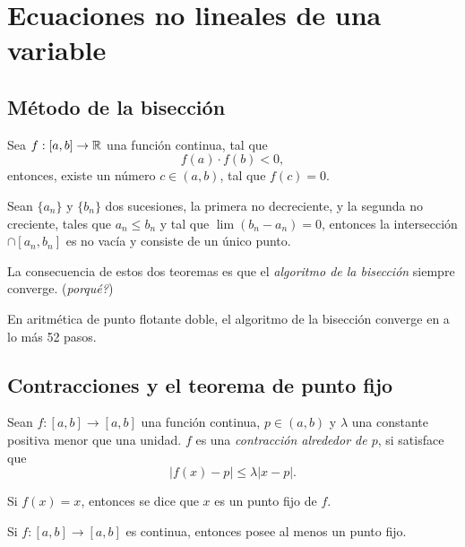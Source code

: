 \section{Ecuaciones no lineales de una variable}

\subsection{Método de la bisección}

\begin{theorem}
  Sea $f: [a, b] \to \mathbb{R}$ una función continua, tal que 
\[f(a)\cdot f(b) < 0,\]
entonces, existe un número $c \in (a, b)$, tal que $f(c) = 0$.
\end{theorem}

\begin{theorem}
  Sean $\{a_n\}$ y $\{b_n\}$ dos sucesiones, la primera no decreciente, y la segunda no creciente, tales que $a_n \leq b_n$ y tal que $\lim (b_n - a_n) = 0$, entonces la intersección $\cap [a_n, b_n]$ es no vacía y consiste de un único punto.
\end{theorem}

La consecuencia de estos dos teoremas es que el \emph{algoritmo de la bisección} siempre converge. (\emph{porqué?})

\begin{theorem}
  En aritmética de punto flotante doble, el algoritmo de la bisección converge en a lo más 52 pasos.
\end{theorem}

\subsection{Contracciones y el teorema de punto fijo}

\begin{definition}
  Sean $f: [a, b] \to [a, b]$ una función continua, $p \in (a, b)$ y $\lambda$ una constante positiva menor que una unidad. $f$ es una \emph{contracción alrededor de $p$}, si satisface que 
\[|f(x) - p| \leq \lambda |x - p|.\]  
\end{definition}

\begin{definition}
  Si $f(x) = x$, entonces se dice que $x$ es un punto fijo de $f$.
\end{definition}

\begin{proposition}
  Si $f: [a, b] \to [a, b]$ es continua, entonces posee al menos un punto fijo.
\end{proposition}

